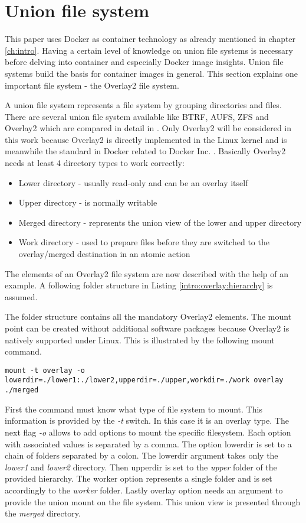 \section{Union file system}
\label{sec:intro:docker_image:unionfs}
This paper uses Docker as container technology as already mentioned in chapter \ref{ch:intro}.
Having a certain level of knowledge on union file systems is necessary before delving into container and especially Docker image insights.
Union file systems build the basis for container images in general.
This section explains one important file system - the Overlay2 file system.

A union file system represents a file system by grouping directories and files.
There are several union file system available like BTRF, AUFS, ZFS and Overlay2 which are compared in detail in \cite{Tarasov2019}.
Only Overlay2 will be considered in this work because Overlay2 is directly implemented in the Linux kernel \cite{Tarasov2019} and is meanwhile the standard in Docker related to Docker Inc. \cite{docker_storage_driver}.
Basically Overlay2 needs at least 4 directory types to work correctly:
\begin{itemize}
\item Lower directory - usually read-only and can be an overlay itself
\item Upper directory - is normally writable
\item Merged directory - represents the union view of the lower and upper directory
\item Work directory - used to prepare files before they are switched to the overlay/merged destination in an atomic action 
\end{itemize}
The elements of an Overlay2 file system are now described with the help of an example. 
A following folder structure in Listing \ref{intro:overlay:hierarchy} is assumed.

The folder structure contains all the mandatory Overlay2 elements. 
The mount point can be created without additional software packages because Overlay2 is natively supported under Linux.
This is illustrated by the following mount command.
\begin{lstlisting}[label={intro:overlay:mountcmd}]
	mount -t overlay -o lowerdir=./lower1:./lower2,upperdir=./upper,workdir=./work overlay ./merged
\end{lstlisting}
First the command must know what type of file system to mount.
This information is provided by the \textit{-t} switch. In this case it is an overlay type. 
The next flag \textit{-o} allows to add options to mount the specific filesystem.
Each option with associated values is separated by a comma.
The option lowerdir is set to a chain of folders separated by a colon. 
The lowerdir argument takes only the \textit{lower1} and \textit{lower2} directory. 
Then upperdir is set to the \textit{upper} folder of the provided hierarchy. 
The worker option represents a single folder and is set accordingly to the \textit{worker} folder. 
Lastly overlay option needs an argument to provide the union mount on the file system. 
This union view is presented through the \textit{merged} directory.

